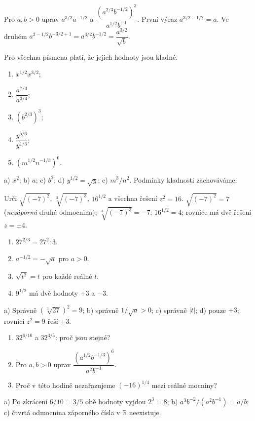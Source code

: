 \documentclass[11pt,a4paper]{article}
\begin{document}
\begin{prikladReseniBox}[title={Příklad 2}]
Pro $a,b>0$ uprav $a^{3/2}a^{-1/2}$ a
$\dfrac{(a^{2/3}b^{-1/2})^3}{a^{1/2}b^{-1}}$.
\tcblower
První výraz $a^{3/2-1/2}=a$.
Ve druhém $a^{2-1/2}b^{-3/2+1}=a^{3/2}b^{-1/2}
=\dfrac{a^{3/2}}{\sqrt b}$.
\end{prikladReseniBox}
\begin{zadaniReseniBox}[title={Samostatná práce 2}]
Pro všechna písmena platí, že jejich hodnoty jsou kladné.
\begin{enumerate}[label=\alph*)]
\item $x^{1/2}x^{3/2}$; \item $\dfrac{a^{7/4}}{a^{3/4}}$;
\item $(b^{2/3})^3$;
\item $\dfrac{y^{5/6}}{y^{1/3}}$;
\item $(m^{1/2}n^{-1/3})^6$.
\end{enumerate}
\tcblower
 a) $x^2$; b) $a$; c) $b^2$; d) $y^{1/2}=\sqrt y$;
 e) $m^3/n^2$. Podmínky kladnosti zachováváme.
\end{zadaniReseniBox}

\begin{prikladReseniBox}[title={Příklad 3}]
Urči $\sqrt{(-7)^2}$, $\sqrt[3]{(-7)^3}$, $16^{1/2}$
a všechna řešení $z^2=16$.
\tcblower
$\sqrt{(-7)^2}=7$ (\emph{nezáporná} druhá odmocnina);
$\sqrt[3]{(-7)^3}=-7$; $16^{1/2}=4$;
rovnice má dvě řešení $z=\pm4$.
\end{prikladReseniBox}
\begin{zadaniReseniBox}[title={Samostatná práce 3}]
\begin{enumerate}[label=\alph*)]
\item $27^{2/3}=27^2:3$.
\item $a^{-1/2}=-\sqrt a$ pro $a>0$.
\item $\sqrt{t^2}=t$ pro každé reálné $t$.
\item $9^{1/2}$ má dvě hodnoty $+3$ a $-3$.
\end{enumerate}
\tcblower
 a) Správně $(\sqrt[3]{27})^2=9$;
 b) správně $1/\sqrt a>0$;
 c) správně $|t|$;
 d) pouze $+3$; rovnici $z^2=9$ řeší $\pm3$.
\end{zadaniReseniBox}

\begin{zadaniReseniBox}[title={Rozšíření 1}]
\begin{enumerate}[label=\alph*)]
\item $32^{6/10}$ a $32^{3/5}$: proč jsou stejné?
\item Pro $a,b>0$ uprav $\dfrac{(a^{1/2}b^{-1/3})^6}{a^2b^{-1}}$.
\item Proč v této hodině nezařazujeme $(-16)^{1/4}$ mezi reálné mocniny?
\end{enumerate}
\tcblower
 a) Po zkrácení $6/10=3/5$ obě hodnoty vyjdou $2^3=8$;
 b) $a^3b^{-2}/(a^2b^{-1})=a/b$;
 c) čtvrtá odmocnina záporného čísla v $\mathbb R$ neexistuje.
\end{zadaniReseniBox}
\end{document}

